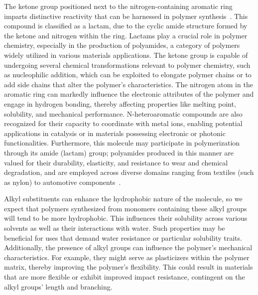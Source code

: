 The ketone group positioned next to the nitrogen-containing aromatic ring imparts distinctive reactivity that can be harnessed in polymer synthesis~\cite{McQuarrieSimonPhysicalChemistry,CareySundbergAdvancedOrganicChemistry,Varghese2022BeyondApplications,Varghese2022BeyondApplications}. This compound is classified as a lactam, due to the cyclic amide structure formed by the ketone and nitrogen within the ring. Lactams play a crucial role in polymer chemistry, especially in the production of polyamides, a category of polymers widely utilized in various materials applications. The ketone group is capable of undergoing several chemical transformations relevant to polymer chemistry, such as nucleophilic addition, which can be exploited to elongate polymer chains or to add side chains that alter the polymer’s characteristics. The nitrogen atom in the aromatic ring can markedly influence the electronic attributes of the polymer and engage in hydrogen bonding, thereby affecting properties like melting point, solubility, and mechanical performance. N-heteroaromatic compounds are also recognized for their capacity to coordinate with metal ions, enabling potential applications in catalysis or in materials possessing electronic or photonic functionalities. Furthermore, this molecule may participate in polymerization through its amide (lactam) group; polyamides produced in this manner are valued for their durability, elasticity, and resistance to wear and chemical degradation, and are employed across diverse domains ranging from textiles (such as nylon) to automotive components~\cite{Varghese2022BeyondApplications,Varghese2022BeyondApplications}.

Alkyl substituents can enhance the hydrophobic nature of the molecule, so we expect that polymers synthesized from monomers containing these alkyl groups will tend to be more hydrophobic. This influences their solubility across various solvents as well as their interactions with water. Such properties may be beneficial for uses that demand water resistance or particular solubility traits. Additionally, the presence of alkyl groups can influence the polymer's mechanical characteristics. For example, they might serve as plasticizers within the polymer matrix, thereby improving the polymer's flexibility. This could result in materials that are more flexible or exhibit improved impact resistance, contingent on the alkyl groups' length and branching.

